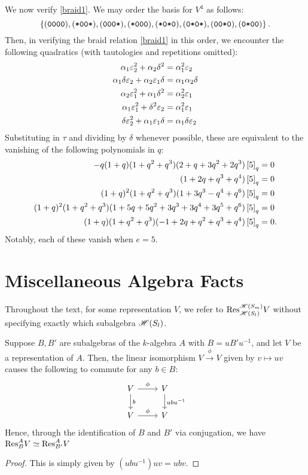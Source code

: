 \documentclass{amsart}
\begin{document}
\vspace{7pt}
We now verify \eqref{braid1}.
We may order the basis for $V^4$ as follows:
\[
  \left\{ (\texttt{0}\texttt{0}\texttt{0}\texttt{0}),(\texttt{*}\texttt{0}\texttt{0}\texttt{*}),(\texttt{0}\texttt{0}\texttt{0}\texttt{*}),(\texttt{*}\texttt{0}\texttt{0}\texttt{0}),(\texttt{*}\texttt{0}\texttt{*}\texttt{0}),(\texttt{0}\texttt{*}\texttt{0}\texttt{*}),(\texttt{0}\texttt{0}\texttt{*}\texttt{0}),(\texttt{0}\texttt{*}\texttt{0}\texttt{0}) \right\}.
\]
Then, in verifying the braid relation \eqref{braid1} in this order, we encounter the following quadratics (with tautologies and repetitions omitted):
\begin{align*}
    \alpha_1\varepsilon_2^2 + \alpha_2\delta^2 &= \alpha_1^2 \varepsilon_2\\
    \alpha_1\delta\varepsilon_2 + \alpha_2\varepsilon_1\delta &= \alpha_1\alpha_2\delta\\
    \alpha_2\varepsilon_1^2 + \alpha_1\delta^2 &= \alpha_2^2\varepsilon_1\\
    \alpha_1\varepsilon_1^2 + \delta^2\varepsilon_2 &= \alpha_1^2\varepsilon_1\\
    \delta\varepsilon_2^2 + \alpha_1\varepsilon_1\delta &= \alpha_1\delta\varepsilon_2
\end{align*}
Substituting in $\tau$ and dividing by $\delta$ whenever possible, these are equivalent to the vanishing of the following polynomials in $q$:
\begin{align*}
  -q (1 + q) (1 + q^2 + q^3) (2 + q + 3 q^2 + 2 q^3) \left[ 5 \right]_q &= 0\\
  (1 + 2 q + q^3 + q^4) \left[ 5 \right]_q &= 0\\
  (1+q)^2 (1+q^2+q^3) (1+3q^3 - q^4 + q^6)\left[ 5 \right]_q &= 0\\
  (1+q)^2 (1+q^2+q^3) (1+5q+5q^2+3q^3+3q^4+3q^5+q^6)\left[ 5 \right]_q &= 0\\
  (1+q) (1+q^2+q^3) (-1+2q+q^2+q^3+q^4)\left[ 5 \right]_q &= 0.
\end{align*}
Notably, each of these vanish when $e = 5$.
  
\section{Miscellaneous Algebra Facts}\label{Algebra}
Throughout the text, for some representation $V$, we refer to $\text{Res}_{\mathscr{H}(S_{l})}^{\mathscr{H}(S_m)} V$ without specifying exactly which subalgebra $\mathscr{H}(S_{l})$.
\begin{proposition}
  Suppose $B,B'$ are subalgebras of the $k$-algebra $A$ with $B = uB'u^{-1}$, and let $V$ be a representation of $A$.
  Then, the linear isomorphism $V \xrightarrow{\phi} V$ given by $v \mapsto uv$ causes the following to commute for any $b \in B$:
  \[
    \begin{tikzcd}
      V \arrow[r,"\phi"] \arrow[d,"b"] & V \arrow[d,"ubu^{-1}"]\\
      V \arrow[r,"\phi"] & V
    \end{tikzcd}
  \]
  Hence, through the identification of $B$ and $B'$ via conjugation, we have $\text{Res}_{B}^A V \simeq \text{Res}_{B'}^A V$
\end{proposition}
\begin{proof}
  This is simply given by $(ubu^{-1})uv = ubv$.
\end{proof}
\end{document}
